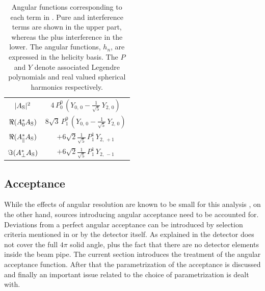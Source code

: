 \begin{table}[t]
\begin{tabular}{cc}
    \hline
    $|{A}_{{\text{S}}}|^2$  &
      $4\, P_0^0\, (Y_{0,\,0} - \tfrac{1}{\sqrt{5}}\, Y_{2,\,0})$  \\ %

    $\Re({A}_{0}^* {A}_{{\text{S}}})$  &
      $8\sqrt{3}\, P_1^0\, (Y_{0,\,0} - \tfrac{1}{\sqrt{5}}\, Y_{2,\,0})$ \\ %

    $\Re({A}_{\parallel}^* {A}_{{\text{S}}})$  &
      $+6\sqrt{2}\tfrac{1}{\sqrt{5}}\, P_1^1\, Y_{2,\,+1}$  \\ %

    $\Im({A}_{\perp}^* {A}_{{\text{S}}})$  &
      $+6\sqrt{2}\tfrac{1}{\sqrt{5}}\, P_1^1\, Y_{2,\,-1}$  \\ %
    \hline
  \end{tabular}
  \caption{Angular functions corresponding to each term in . Pure and interference \pwave terms are shown in the upper part,
    whereas the \swave plus \spwave interference in the lower. The angular functions, $h_n$, are expressed in the helicity basis.
    The $P$ and $Y$ denote associated Legendre polynomials and real valued spherical harmonics respectively.}
  \label{ang_distr}
\end{table}

\subsection{Acceptance}
\label{Accceptance}
While the effects of angular resolution are known to be small for this analysis \cite{tristanThesis},
on the other hand, sources introducing angular acceptance need to be accounted for.
Deviations from a perfect angular acceptance can be introduced by selection criteria mentioned in  or by the detector itself.
As explained in  the \lhcb detector does not cover the full $4\pi$ solid angle, plus the fact that
there are no detector elements inside the \lhc beam pipe. The current section introduces the treatment of
the angular acceptance function. After that the parametrization of the acceptance is discussed and finally an important
issue related to the choice of parametrization is dealt with.

